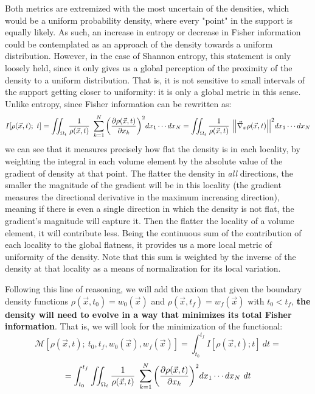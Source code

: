 \documentclass[11pt, a4paper]{article} %
\newcommand{\M}{\mathcal{M}}
\begin{document}
Both metrics are extremized with the most uncertain of the densities, which would be a uniform probability density, where every "point" in the support is equally likely. As such, an increase in entropy or decrease in Fisher information could be contemplated as an approach of the density towards a uniform distribution. However, in the case of Shannon entropy, this statement is only loosely held, since it only gives us a global perception of the proximity of the density to a uniform distribution. That is, it is not sensitive to small intervals of the support getting closer to uniformity: it is only a global metric in this sense. Unlike entropy, since Fisher information can be rewritten as:
\begin{equation}
I[\rho(\vec{x},t);\ t]=\iint_{\Omega_t} \frac{1}{\rho(\vec{x},t)}\ \sum_{k=1}^N \qty(\pdv{\rho(\vec{x},t)}{x_k})^2 dx_1\cdots dx_N=\iint_{\Omega_t} \frac{1}{\rho(\vec{x},t)}\ \Big|\Big|\vec{\nabla}_{x}\rho(\vec{x},t)\Big|\Big|^2 dx_1\cdots dx_N
\end{equation}
we can see that it measures precisely how flat the density is in each locality, by weighting the integral in each volume element by the absolute value of the gradient of density at that point. The flatter the density in {\em all} directions, the smaller the magnitude of the gradient will be in this locality (the gradient measures the directional derivative in the maximum increasing direction), meaning if there is even a single direction in which the density is not flat, the gradient's magnitude will capture it. Then the flatter the locality of a volume element, it will contribute less. Being the continuous sum of the contribution of each locality to the global flatness, it provides us a more local metric of uniformity of the density. Note that this sum is weighted by the inverse of the density at that locality as a means of normalization for its local variation.

Following this line of reasoning, we will add the axiom that given the boundary density functions $\rho(\vec{x},t_0)=w_0(\vec{x})$ and $\rho(\vec{x},t_f)=w_f(\vec{x})$ with $t_0<t_f$, {\bf the density will need to evolve in a way that minimizes its total Fisher information}. That is, we will look for the minimization of the functional:
\begin{equation}\label{discomfort1}
\M[\rho(\vec{x},t);\ t_0,t_f,w_0(\vec{x}), w_f(\vec{x})]=\int_{t_0}^{t_f} I[\rho(\vec{x},t);t]\ dt=
\end{equation} 
$$
=\int_{t_0}^{t_f} \iint_{\Omega_t} \frac{1}{\rho(\vec{x},t)}\ \sum_{k=1}^N \qty(\pdv{\rho(\vec{x},t)}{x_k})^2 dx_1\cdots dx_N\ dt
$$
\end{document}
